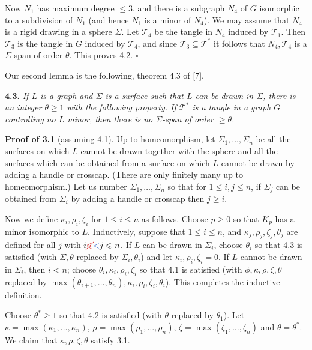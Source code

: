 Now $N_1$ has maximum degree $\le 3$, and there is a subgraph $N_4$ of $G$ isomorphic to a subdivision of $N_1$ (and hence $N_1$ is a minor of $N_4$). We may assume that $N_4$ is a rigid drawing in a sphere $\Sigma$. Let $\mathscr{T}_4$ be the tangle in $N_4$ induced by $\mathscr{T}_1$. Then $\mathscr{T}_3$ is the tangle in $G$ induced by $\mathscr{T}_4$, and since $\mathscr{T}_3 \subseteq \mathscr{T}^*$ it follows that $N_4, \mathscr{T}_4$ is a $\Sigma$-span of order $\theta$. This proves 4.2. $\square$

Our second lemma is the following, theorem 4.3 of [7].

\textbf{4.3.} \textit{If $L$ is a graph and $\Sigma$ is a surface such that $L$ can be drawn in $\Sigma$, there is an integer $\theta \ge 1$ with the following property. If $\mathscr{T}^*$ is a tangle in a graph $G$ controlling no $L$ minor, then there is no $\Sigma$-span of order $\ge \theta$.}

\textbf{Proof of 3.1} (assuming 4.1). Up to homeomorphism, let $\Sigma_1, \dots, \Sigma_n$ be all the surfaces on which $L$ cannot be drawn together with the sphere and all the surfaces which can be obtained from a surface on which $L$ cannot be drawn by adding a handle or crosscap. (There are only finitely many up to homeomorphism.) Let us number $\Sigma_1, \dots, \Sigma_n$ so that for $1 \le i, j \le n$, if $\Sigma_j$ can be obtained from $\Sigma_i$ by adding a handle or crosscap then $j \ge i$.

Now we define $\kappa_i, \rho_i, \zeta_i$ for $1 \le i \le n$ as follows. Choose $p \ge 0$ so that $K_p$ has a minor isomorphic to $L$. Inductively, suppose that $1 \le i \le n$, and $\kappa_j, \rho_j, \zeta_j, \theta_j$ are defined for all $j$ with $i \delm{\le}\fix{<} j \le n$. If $L$ can be drawn in $\Sigma_i$, choose $\theta_i$ so that 4.3 is satisfied (with $\Sigma, \theta$ replaced by $\Sigma_i, \theta_i$) and let $\kappa_i, \rho_i, \zeta_i = 0$. If $L$ cannot be drawn in $\Sigma_i$, then $i < n$; choose $\theta_i, \kappa_i, \rho_i, \zeta_i$ so that 4.1 is satisfied (with $\phi, \kappa, \rho, \zeta, \theta$ replaced by $\max(\theta_{i+1}, \dots, \theta_n), \kappa_i, \rho_i, \zeta_i, \theta_i$). This completes the inductive definition.

Choose $\theta^* \ge 1$ so that 4.2 is satisfied (with $\theta$ replaced by $\theta_1$). Let $\kappa = \max(\kappa_1, \dots, \kappa_n)$, $\rho = \max(\rho_1, \dots, \rho_n)$, $\zeta = \max(\zeta_1, \dots, \zeta_n)$ and $\theta = \theta^*$. We claim that $\kappa, \rho, \zeta, \theta$ satisfy 3.1.

